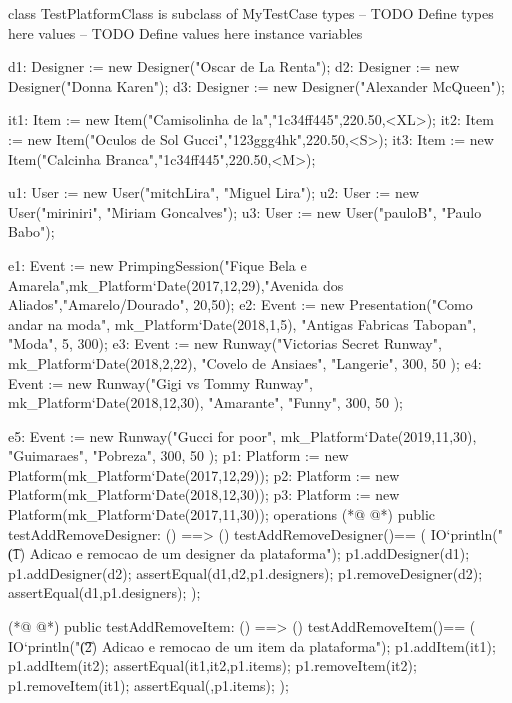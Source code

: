 \begin{vdmpp}[breaklines=true]
class TestPlatformClass is subclass of MyTestCase
types
-- TODO Define types here
values
-- TODO Define values here
instance variables
 
 d1: Designer := new Designer("Oscar de La Renta");
 d2: Designer := new Designer("Donna Karen");
 d3: Designer := new Designer("Alexander McQueen");
 
 it1: Item := new Item("Camisolinha de la","1c34ff445",220.50,<XL>);
 it2: Item := new Item("Oculos de Sol Gucci","123ggg4hk",220.50,<S>);
 it3: Item := new Item("Calcinha Branca","1c34ff445",220.50,<M>);
 
 u1: User := new User("mitchLira", "Miguel Lira");
 u2: User := new User("miriniri", "Miriam Goncalves");
 u3: User := new User("pauloB", "Paulo Babo");
 

 e1: Event := new PrimpingSession("Fique Bela e Amarela",mk_Platform`Date(2017,12,29),"Avenida dos Aliados","Amarelo/Dourado",
                  20,50);
 e2: Event := new Presentation("Como andar na moda",
                 mk_Platform`Date(2018,1,5),
                 "Antigas Fabricas Tabopan",
                 "Moda",
                 5,
                 300);
 e3: Event := new Runway("Victorias Secret Runway",
              mk_Platform`Date(2018,2,22),
              "Covelo de Ansiaes",
              "Langerie",
              300,
              50
              );
 e4: Event := new Runway("Gigi vs Tommy Runway",
              mk_Platform`Date(2018,12,30),
              "Amarante",
              "Funny",
              300,
              50
              );
 
 e5: Event := new Runway("Gucci for poor",
              mk_Platform`Date(2019,11,30),
              "Guimaraes",
              "Pobreza",
              300,
              50
              );                          
 p1: Platform := new Platform(mk_Platform`Date(2017,12,29));
 p2: Platform := new Platform(mk_Platform`Date(2018,12,30));
 p3: Platform := new Platform(mk_Platform`Date(2017,11,30));
operations
(*@
\label{testAddRemoveDesigner:55}
@*)
 public testAddRemoveDesigner: () ==> ()
 testAddRemoveDesigner()==
 (
    IO`println("\t (1) Adicao e remocao de um designer da plataforma");
  p1.addDesigner(d1);
  p1.addDesigner(d2);
  assertEqual({d1,d2},p1.designers);
  p1.removeDesigner(d2);
  assertEqual({d1},p1.designers);
 );
 
(*@
\label{testAddRemoveItem:66}
@*)
 public testAddRemoveItem: () ==> ()
 testAddRemoveItem()==
 (
  IO`println("\t (2) Adicao e remocao de um item da plataforma");
  p1.addItem(it1);
  p1.addItem(it2);
  assertEqual({it1,it2},p1.items);
  p1.removeItem(it2);
  p1.removeItem(it1);
  assertEqual({},p1.items);
 );
 

\end{vdmpp}

